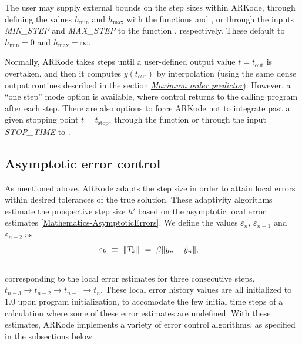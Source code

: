 \documentclass[letterpaper,10pt,english]{sphinxmanual}
\begin{document}
The user may supply external bounds on the step sizes within ARKode,
through defining the values $h_\text{min}$ and $h_\text{max}$ with
the functions {\hyperref[c_interface/User_callable:ARKodeSetMinStep]{}} and
{\hyperref[c_interface/User_callable:ARKodeSetMaxStep]{}}, or through the inputs \emph{MIN\_STEP} and
\emph{MAX\_STEP} to the function {\hyperref[f_interface/Usage:f/_/FARKSETRIN]{}}, respectively.
These default to $h_\text{min}=0$ and $h_\text{max}=\infty$.

Normally, ARKode takes steps until a user-defined output value
$t = t_\text{out}$ is overtaken, and then it computes
$y(t_\text{out})$ by interpolation (using the same dense output
routines described in the section
{\hyperref[Mathematics:mathematics-predictors-max]{\emph{Maximum order predictor}}}). However, a ``one step'' mode option
is available, where control returns to the calling program after each
step. There are also options to force ARKode not to integrate past a
given stopping point $t = t_\text{stop}$, through the function
{\hyperref[c_interface/User_callable:ARKodeSetStopTime]{}} or through the input \emph{STOP\_TIME} to
{\hyperref[f_interface/Usage:f/_/FARKSETRIN]{}}.


\subsection{Asymptotic error control}
\label{Mathematics:asymptotic-error-control}\label{Mathematics:mathematics-adaptivity-errorcontrol}
As mentioned above, ARKode adapts the step size in order to attain
local errors within desired tolerances of the true solution.  These
adaptivity algorithms estimate the prospective step size $h'$
based on the asymptotic local error estimates \eqref{Mathematics-AsymptoticErrors}.
We define the values $\varepsilon_n$, $\varepsilon_{n-1}$
and $\varepsilon_{n-2}$ as
\begin{gather}
\begin{split}\varepsilon_k &\ \equiv \ \|T_k\|
   \ = \ \beta \|y_n - \tilde{y}_n\|,\end{split}\notag\\\begin{split}\end{split}\notag
\end{gather}
corresponding to the local error estimates for three consecutive
steps, $t_{n-3} \to t_{n-2} \to t_{n-1} \to t_n$.  These local
error history values are all initialized to 1.0 upon program
initialization, to accomodate the few initial time steps of a
calculation where some of these error estimates are undefined.  With
these estimates, ARKode implements a variety of error control
algorithms, as specified in the subsections below.
\end{document}
